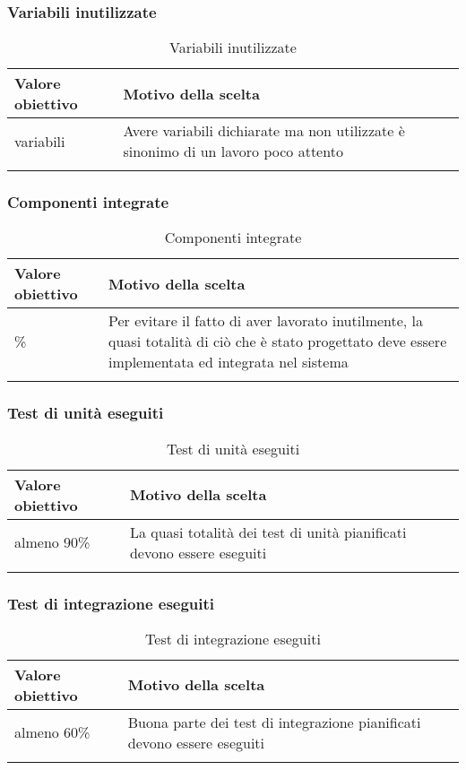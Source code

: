 \documentclass[../PianoDiQualifica.tex]{subfiles}
\begin{document}
		\subsubsection{Variabili inutilizzate}
			\begin{longtable}[c] { >{\centering\arraybackslash}p{4cm} p{7cm} }
				\toprule
				\centerline{\textbf{Valore obiettivo}} & \centerline{\textbf{Motivo della scelta}} \\
				\midrule
					0 variabili &	Avere variabili dichiarate ma non utilizzate è sinonimo di un lavoro poco attento \\
				\bottomrule
				\caption{Variabili inutilizzate}
			\end{longtable}
		
		\subsubsection{Componenti integrate}
			\begin{longtable}[c] { >{\centering\arraybackslash}p{4cm} p{7cm} }
				\toprule
				\centerline{\textbf{Valore obiettivo}} & \centerline{\textbf{Motivo della scelta}} \\
				\midrule
					90\% &	Per evitare il fatto di aver lavorato inutilmente, la quasi totalità di ciò che è stato progettato deve essere implementata ed integrata nel sistema\\
				\bottomrule
				\caption{Componenti integrate}
			\end{longtable}
			
		\subsubsection{Test di unità eseguiti}
			\begin{longtable}[c] { >{\centering\arraybackslash}p{4cm} p{7cm} }
				\toprule
				\centerline{\textbf{Valore obiettivo}} & \centerline{\textbf{Motivo della scelta}} \\
				\midrule
					almeno 90\% &	La quasi totalità dei test di unità pianificati devono essere eseguiti \\
				\bottomrule
				\caption{Test di unità eseguiti}
			\end{longtable}
			
		\subsubsection{Test di integrazione eseguiti}
			\begin{longtable}[c] { >{\centering\arraybackslash}p{4cm} p{7cm} }
				\toprule
				\centerline{\textbf{Valore obiettivo}} & \centerline{\textbf{Motivo della scelta}} \\
				\midrule
					almeno 60\% & Buona parte dei test di integrazione pianificati devono essere eseguiti \\
				\bottomrule
				\caption{Test di integrazione eseguiti}
			\end{longtable}
			
\end{document}
